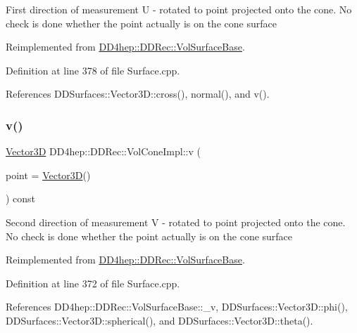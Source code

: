 First direction of measurement U -\/ rotated to point projected onto the cone. No check is done whether the point actually is on the cone surface 

Reimplemented from \hyperlink{class_d_d4hep_1_1_d_d_rec_1_1_vol_surface_base_a4eb22902d5caf992589142a93accc48d}{D\+D4hep\+::\+D\+D\+Rec\+::\+Vol\+Surface\+Base}.



Definition at line 378 of file Surface.\+cpp.



References D\+D\+Surfaces\+::\+Vector3\+D\+::cross(), normal(), and v().

\hypertarget{class_d_d4hep_1_1_d_d_rec_1_1_vol_cone_impl_a87e96fba8185dccf1422d60a748f5d2f}{}\label{class_d_d4hep_1_1_d_d_rec_1_1_vol_cone_impl_a87e96fba8185dccf1422d60a748f5d2f} 
\subsubsection{\texorpdfstring{v()}{v()}}
{\footnotesize\ttfamily \hyperlink{class_d_d_surfaces_1_1_vector3_d}{Vector3D} D\+D4hep\+::\+D\+D\+Rec\+::\+Vol\+Cone\+Impl\+::v (\begin{DoxyParamCaption}\item[{const \hyperlink{class_d_d_surfaces_1_1_vector3_d}{Vector3D} \&}]{point = {\ttfamily \hyperlink{class_d_d_surfaces_1_1_vector3_d}{Vector3D}()} }\end{DoxyParamCaption}) const\hspace{0.3cm}{\ttfamily [virtual]}}

Second direction of measurement V -\/ rotated to point projected onto the cone. No check is done whether the point actually is on the cone surface 

Reimplemented from \hyperlink{class_d_d4hep_1_1_d_d_rec_1_1_vol_surface_base_a94d4f190a803d08a9739fb31a8c6fd2f}{D\+D4hep\+::\+D\+D\+Rec\+::\+Vol\+Surface\+Base}.



Definition at line 372 of file Surface.\+cpp.



References D\+D4hep\+::\+D\+D\+Rec\+::\+Vol\+Surface\+Base\+::\+\_\+v, D\+D\+Surfaces\+::\+Vector3\+D\+::phi(), D\+D\+Surfaces\+::\+Vector3\+D\+::spherical(), and D\+D\+Surfaces\+::\+Vector3\+D\+::theta().



